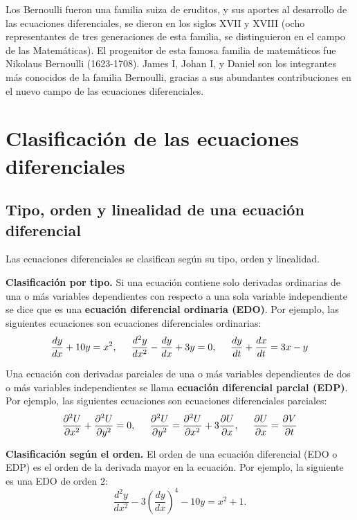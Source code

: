 \documentclass[12pt,a4paper,oneside]{book}
\begin{document}
	\medskip
	\noindent
	Los Bernoulli fueron una familia suiza de eruditos, y sus aportes al desarrollo de las ecuaciones diferenciales, se dieron en los siglos XVII y XVIII (ocho representantes de tres generaciones de esta familia, se distinguieron en el campo
	de las Matemáticas). El progenitor de esta famosa familia de matemáticos fue Nikolaus Bernoulli (1623-1708). James I, Johan I, y Daniel son los integrantes más conocidos de la familia Bernoulli, gracias a sus abundantes contribuciones en el nuevo campo de las ecuaciones diferenciales.
	
	\chapter{Clasificación de las ecuaciones diferenciales}
	
	\section{Tipo, orden y linealidad de una ecuación diferencial}
	\noindent
	Las ecuaciones diferenciales se clasifican según su tipo, orden y linealidad.
	
	\medskip
	\noindent
	\textbf{Clasificación por tipo.} Si una ecuación contiene solo derivadas ordinarias de una o más variables dependientes con respecto a una sola variable independiente se dice que es una \textbf{ecuación diferencial ordinaria (EDO)}. Por ejemplo, las siguientes ecuaciones son ecuaciones diferenciales ordinarias:
	\[
	\frac{dy}{dx} + 10y = x^2, \hspace{0.5cm} \frac{d^2y}{dx^2} - \frac{dy}{dx} + 3y = 0, \hspace{0.5cm} \frac{dy}{dt} + \frac{dx}{dt} = 3x-y
	\]
	
	\noindent
	Una ecuación con derivadas parciales de una o más variables dependientes de dos o más variables independientes se llama \textbf{ecuación diferencial parcial (EDP)}. Por ejemplo, las siguientes ecuaciones son ecuaciones diferenciales parciales:
	\[
	 \frac{\partial^2U}{\partial x^2} + \frac{\partial^2U}{\partial y^2} = 0, \hspace{0.5cm} \frac{\partial^2U}{\partial y^2} =  \frac{\partial^2U}{\partial x^2} + 3\frac{\partial U}{\partial x} , \hspace{0.5cm} \frac{\partial U}{\partial x} = \frac{\partial V}{\partial t}
	\]
	
	\noindent
	\textbf{Clasificación según el orden.} El orden de una ecuación diferencial (EDO o EDP) es el orden de la derivada mayor en la ecuación. Por ejemplo, la siguiente es una EDO de orden 2:
	\[
	  \frac{d^2y}{d x^2} - 3\left(\frac{d y}{d x}\right)^4 - 10y = x^2 + 1.
	\]
	
\end{document}

